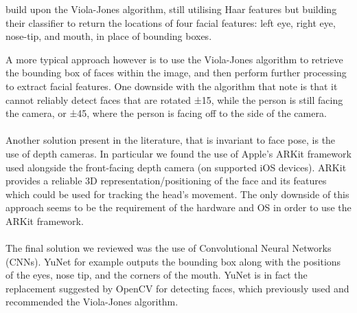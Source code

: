 \citeauthor{kim2017real} build upon the Viola-Jones algorithm, still utilising Haar features but building their classifier to return the locations of four facial features: left eye, right eye, nose-tip, and mouth, in place of bounding boxes\cite{kim2017real}.

A more typical approach however is to use the Viola-Jones algorithm to retrieve the bounding box of faces within the image, and then perform further processing to extract facial features\cite{neto2012real, francone2011using, kim2017real}.
One downside with the algorithm that \citeauthor{viola2004robust} note is that it cannot reliably detect faces that are rotated ±15\textdegree, while the person is still facing the camera, or ±45\textdegree, where the person is facing off to the side of the camera.
\\\\
Another solution present in the literature, that is invariant to face pose, is the use of depth cameras. 
In particular we found the use of Apple's ARKit framework used alongside the front-facing depth camera (on supported iOS devices)\cite{voelker2020headreach,hueber2020headbang,deepateep2020facial}.
ARKit provides a reliable 3D representation/positioning of the face and its features  which could be used for tracking the head's movement.
The only downside of this approach seems to be the requirement of the hardware and OS in order to use the ARKit framework.
\\\\
The final solution we reviewed was the use of Convolutional Neural Networks (CNNs).
YuNet\cite{yu2022yunet} for example outputs the bounding box along with the positions of the eyes, nose tip, and the corners of the mouth. YuNet is in fact the replacement suggested by OpenCV for detecting faces, which previously used and recommended the Viola-Jones algorithm.

